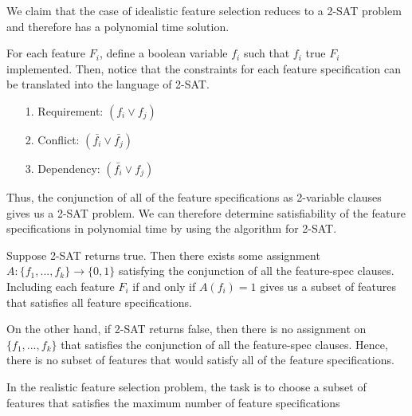 \documentclass{article}
\begin{document}
\begin{solution}
We claim that the case of idealistic feature selection reduces to a 2-SAT problem and therefore has a polynomial time solution.

For each feature $F_i$, define a boolean variable $f_i$ such that $f_i$ true \iff $F_i$ implemented. Then, notice that the constraints for each feature specification can be translated into the language of 2-SAT.
\begin{enumerate}
    \item [1.] Requirement: $(f_i \lor f_j)$
    \item [2.] Conflict: $(\bar{f_i} \lor \bar{f_j})$
    \item [3.] Dependency: $(\bar{f_i} \lor f_j)$
\end{enumerate}
Thus, the conjunction of all of the feature specifications as 2-variable clauses gives us a 2-SAT problem.
We can therefore determine satisfiability of the feature specifications in polynomial time by using the algorithm for 2-SAT.

\begin{subproof}[Correctness.]
Suppose 2-SAT returns true. Then there exists some assignment
$A: \{f_1, ..., f_k\} \rightarrow \{0,1\}$ satisfying the conjunction of all the feature-spec clauses.
Including each feature $F_i$ if and only if $A(f_i) = 1$ gives us a subset of features that satisfies all feature specifications.

On the other hand, if 2-SAT returns false, then there is no assignment on $\{f_1, ..., f_k\}$ that satisfies the conjunction of all the feature-spec clauses.
Hence, there is no subset of features that would satisfy all of the feature specifications.
\end{subproof}

\end{solution}
\pagebreak




\begin{subexercise}
In the realistic feature selection problem, the task is to choose a subset of features that satisfies the maximum number of feature specifications
\end{subexercise}
\end{document}
